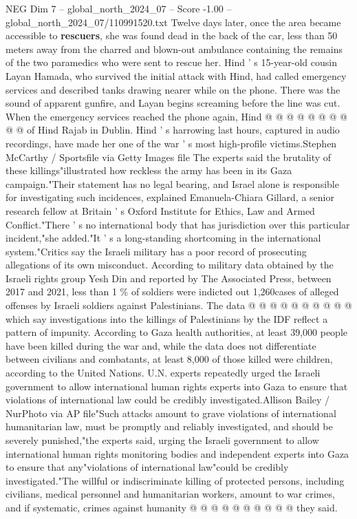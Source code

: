 \begin{textsample}{NEG Dim 7 – global\_north\_2024\_07 – Score -1.00 – global\_north\_2024\_07/110991520.txt}
Twelve days later, once the area became accessible to \textbf{rescuers}, she was found dead in the back of the car, less than 50 meters away from the charred and blown-out ambulance containing the remains of the two paramedics who were sent to rescue her.
Hind ' s 15-year-old cousin Layan Hamada, who survived the initial attack with Hind, had called emergency services and described tanks drawing nearer while on the phone.
There was the sound of apparent gunfire, and Layan begins screaming before the line was cut.
When the emergency services reached the phone again, Hind @ @ @ @ @ @ @ @ @ @ of Hind Rajab in Dublin.
Hind ' s harrowing last hours, captured in audio recordings, have made her one of the war ' s most high-profile victims.Stephen McCarthy / Sportsfile via Getty Images file The experts said the brutality of these killings"illustrated how reckless the army has been in its Gaza campaign."Their statement has no legal bearing, and Israel alone is responsible for investigating such incidences, explained Emanuela-Chiara Gillard, a senior research fellow at Britain ' s Oxford Institute for Ethics, Law and Armed Conflict."There ' s no international body that has jurisdiction over this particular incident,"she added."It ' s a long-standing shortcoming in the international system."Critics say the Israeli military has a poor record of prosecuting allegations of its own misconduct.
According to military data obtained by the Israeli rights group Yesh Din and reported by The Associated Press, between 2017 and 2021, less than 1 \% of soldiers were indicted out 1,260cases of alleged offenses by Israeli soldiers against Palestinians.
The data @ @ @ @ @ @ @ @ @ @ which say investigations into the killings of Palestinians by the IDF reflect a pattern of impunity.
According to Gaza health authorities, at least 39,000 people have been killed during the war and, while the data does not differentiate between civilians and combatants, at least 8,000 of those killed were children, according to the United Nations.
U.N. experts repeatedly urged the Israeli government to allow international human rights experts into Gaza to ensure that violations of international law could be credibly investigated.Allison Bailey / NurPhoto via AP file"Such attacks amount to grave violations of international humanitarian law, must be promptly and reliably investigated, and should be severely punished,"the experts said, urging the Israeli government to allow international human rights monitoring bodies and independent experts into Gaza to ensure that any"violations of international law"could be credibly investigated."The willful or indiscriminate killing of protected persons, including civilians, medical personnel and humanitarian workers, amount to war crimes, and if systematic, crimes against humanity @ @ @ @ @ @ @ @ @ @ they said.

\end{textsample}
